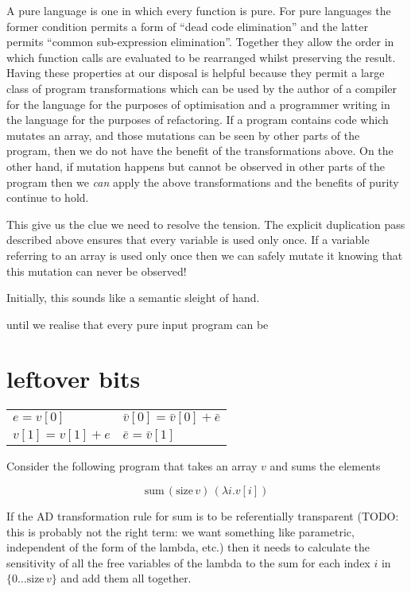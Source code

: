 \documentclass[12pt]{article}
\begin{document}
A pure language is one in which every function is pure.  For pure
languages the former condition permits a form of ``dead code
elimination'' and the latter permits ``common sub-expression
elimination''.  Together they allow the order in which function calls
are evaluated to be rearranged whilst preserving the result.  Having
these properties at our disposal is helpful because they permit a
large class of program transformations which can be used by the author
of a compiler for the language for the purposes of optimisation and a
programmer writing in the language for the purposes of refactoring.
If a program contains code which mutates an array, and those mutations
can be seen by other parts of the program, then we do not have the
benefit of the transformations above.  On the other hand, if mutation
happens but cannot be observed in other parts of the program then we
\emph{can} apply the above transformations and the benefits of purity
continue to hold.

This give us the clue we need to resolve the tension.  The explicit
duplication pass described above ensures that every variable is used
only once.  If a variable referring to an array is used only once then
we can safely mutate it knowing that this mutation can never be
observed!

Initially, this sounds like a semantic sleight of hand. 


 until we realise that
every pure input program can be 





\section{leftover bits}

\begin{tabular}[t]{ll}
  $e = v[0]$
  &
  $\bar{v}[0] = \bar{v}[0] + \bar{e}$
  \\
  
  $v[1] = v[1] + e$
  &
  $\bar{e} = \bar{v}[1]$
  \\
\end{tabular}

Consider the following program that takes an array $v$ and sums the
elements

\[
\textrm{sum} \, (\textrm{size} \, v) \, (\lambda i. v[i])
\]

If the AD transformation rule for sum is to be referentially
transparent (TODO: this is probably not the right term: we want
something like parametric, independent of the form of the lambda,
etc.) then it needs to calculate the sensitivity of all the free
variables of the lambda to the sum for each index $i$ in $\{ 0 \ldots
\textrm{size} \, v\}$ and add them all together.  
\end{document}
